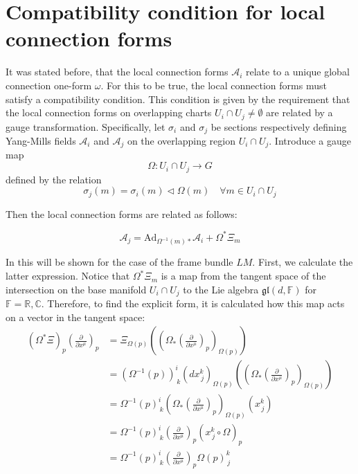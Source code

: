 \section{Compatibility condition for local connection forms}


It was stated before, that the local connection forms $\mathcal{A}_i$ relate to a unique global connection one-form $\omega$. For this to be true, the local connection forms must satisfy a compatibility condition. This condition is given by the requirement that the local connection forms on overlapping charts \( U_i \cap U_j \neq \emptyset\) are related by a gauge transformation\cite{NakaharaGeometrytopologyphysics2005}. Specifically, let $\sigma_i$ and $\sigma_j$ be sections respectively defining Yang-Mills fields \( \mathcal{A}_i \) and \( \mathcal{A}_j \) on the overlapping region \( U_i \cap U_j \). Introduce a gauge map
\[ \Omega : U_i \cap U_j \longrightarrow G \]
defined by the relation
\[ \sigma_j(m) = \sigma_i(m) \triangleleft \Omega(m) \quad \forall m \in U_i \cap U_j \]


Then the local connection forms are related as follows:

\[ \mathcal{A}_j = \text{Ad}_{\Omega^{-1}(m)*} \mathcal{A}_i + \Omega^*\Xi_m \]

In this will be shown for the case of the frame bundle \( LM \). First, we calculate the latter expression. Notice that \( \Omega^* \Xi_m \) is a map from the tangent space of the intersection on the base manifold \( U_i \cap U_j \) to the Lie algebra \( \mathfrak{gl}(d, \mathbb{F}) \) for $\mathbb{F} = \mathbb{R,C}$. Therefore, to find the explicit form, it is calculated how this map acts on a vector in the tangent space:
\begin{align*}
  (\Omega^* \Xi)_p \left( \frac{\partial}{\partial x^\mu} \right)_p 
  &= \Xi_{\Omega(p)}\left( \left( \Omega_* \left( \frac{\partial}{\partial x^\mu} \right)_p \right)_{\Omega(p)} \right) \\
  &= (\Omega^{-1}(p))^i_{\,k}(dx^k_{\,j})_{\Omega(p)}\left( \left( \Omega_* \left( \frac{\partial}{\partial x^\mu} \right)_p \right)_{\Omega(p)} \right) \\
  &= \Omega^{-1}(p)^i_{\,k} \left( \Omega_* \left( \frac{\partial}{\partial x^\mu} \right)_p \right)_{\Omega(p)} \left( x^k_{\,j} \right) \\
  &= \Omega^{-1}(p)^i_{\,k} \left( \frac{\partial}{\partial x^\mu}  \right)_p \left( x^k_{\,j} \circ \Omega \right)_p \\
  &= \Omega^{-1}(p)^i_{\,k} \left( \frac{\partial}{\partial x^\mu}  \right)_p \Omega(p)^k_{\,j}
\end{align*}

